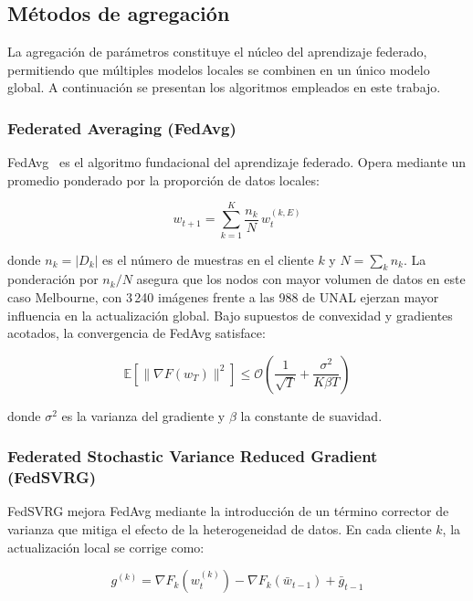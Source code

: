 \subsection{Métodos de agregación}
\label{subsec:agregacion}
 
La agregación de parámetros constituye el núcleo del aprendizaje federado, permitiendo que
múltiples modelos locales se combinen en un único modelo global. A continuación se presentan
los algoritmos empleados en este trabajo.
 
\subsubsection{Federated Averaging (FedAvg)}
 
FedAvg~\citep{mcmahan2017communication} es el algoritmo fundacional del aprendizaje
federado. Opera mediante un promedio ponderado por la proporción de datos locales:
 
\begin{equation}
    w_{t+1} = \sum_{k=1}^{K} \frac{n_k}{N}\, w_t^{(k,E)}
    \label{eq:fedavg}
\end{equation}
 
donde $n_k = |D_k|$ es el número de muestras en el cliente $k$ y $N = \sum_{k} n_k$.
La ponderación por $n_k / N$ asegura que los nodos con mayor volumen de datos en este
caso Melbourne, con 3\,240 imágenes frente a las 988 de UNAL ejerzan mayor influencia
en la actualización global. Bajo supuestos de convexidad y gradientes acotados, la
convergencia de FedAvg satisface:
 
\[
\mathbb{E}\!\left[\|\nabla F(w_T)\|^2\right] \leq
    \mathcal{O}\!\left(\frac{1}{\sqrt{T}} + \frac{\sigma^2}{K\beta T}\right)
\]
 
donde $\sigma^2$ es la varianza del gradiente y $\beta$ la constante de suavidad.
 
\subsubsection{Federated Stochastic Variance Reduced Gradient (FedSVRG)}
 
FedSVRG mejora FedAvg mediante la introducción de un término corrector de varianza que
mitiga el efecto de la heterogeneidad de datos. En cada cliente $k$, la actualización
local se corrige como:
 
\begin{equation}
    g^{(k)} = \nabla F_k\!\left(w_t^{(k)}\right) -
               \nabla F_k\!\left(\bar{w}_{t-1}\right) + \bar{g}_{t-1}
\end{equation}
 
